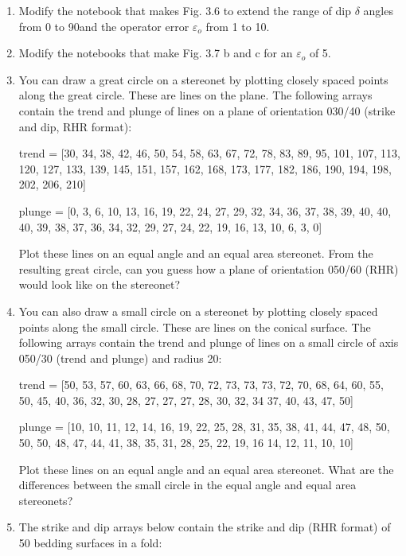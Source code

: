 \documentclass[a4paper , 12pt]{book}
\begin{document}
\begin{enumerate}
  \item Modify the notebook that makes Fig. 3.6 to extend the range of dip $\delta$ angles from 0 to 90\degree and the operator error $\varepsilon_o$ from 1 to 10\degree.
  
  \item Modify the notebooks that make Fig. 3.7 b and c for an $\varepsilon_o$ of 5\degree.
  
  \item You can draw a great circle on a stereonet by plotting closely spaced points along the great circle. These are lines on the plane. The following arrays contain the trend and plunge of lines on a plane of orientation 030/40 (strike and dip, RHR format):
  
  trend = [30, 34, 38, 42, 46, 50, 54, 58, 63, 67, 72, 78, 83, 89, 95, 101, 107, 113, 120, 127, 133, 139, 145, 151, 157, 162, 168, 173, 177, 182, 186, 190, 194, 198, 202, 206, 210]
  
  plunge = [0, 3, 6, 10, 13, 16, 19, 22, 24, 27, 29, 32, 34, 36, 37, 38, 39, 40, 40, 40, 39, 38, 37, 36, 34, 32, 29, 27, 24, 22, 19, 16, 13, 10, 6, 3, 0]
  
  Plot these lines on an equal angle and an equal area stereonet. From the resulting great circle, can you guess how a plane of orientation 050/60 (RHR) would look like on the stereonet? 
  
  \item You can also draw a small circle on a stereonet by plotting closely spaced points along the small circle. These are lines on the conical surface. The following arrays contain the trend and plunge of lines on a small circle of axis 050/30 (trend and plunge) and radius 20\degree:
  
  trend = [50, 53, 57, 60, 63, 66, 68, 70, 72, 73, 73, 73, 72, 70, 68, 64, 60, 55, 50, 45, 40, 36, 32, 30, 28, 27, 27, 27, 28, 30, 32, 34 37, 40, 43, 47, 50]
  
  plunge = [10, 10, 11, 12, 14, 16, 19, 22, 25, 28, 31, 35, 38, 41, 44, 47, 48, 50, 50, 50, 48, 47, 44, 41, 38, 35, 31, 28, 25, 22, 19, 16 14, 12, 11, 10, 10]
  
  Plot these lines on an equal angle and an equal area stereonet. What are the differences between the small circle in the equal angle and equal area stereonets?
  
  \item The strike and dip arrays below contain the strike and dip (RHR format) of 50 bedding surfaces in a fold:
  

\end{enumerate}
\end{document}
